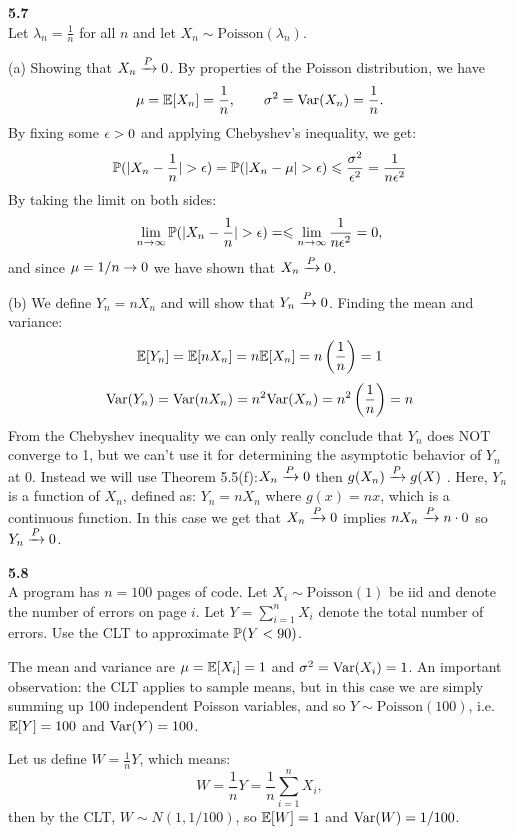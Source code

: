  \newpage\noindent
 \textbf{5.7}\\  %
 Let $\lambda_n = \frac{1}{n}$ for all $n$ and let $X_n\sim\text{Poisson}(\lambda_n)$.

 \medskip\noindent(a) Showing that $X_n \raP 0$. By properties of the Poisson
 distribution, we have
 $$
\mu = \E[X_n] = \frac{1}{n},\qquad \sigma^2 = \V(X_n) = \frac{1}{n}.
 $$
 By fixing some $\eps > 0$ and applying Chebyshev's inequality, we get:
 $$
 \P(|X_n - \frac{1}{n}| > \eps) = \P(|X_n - \mu| > \eps) \leq \frac{\sigma^2}{\eps^2} = \frac{1}{n\eps^2}
 $$
By taking the limit on both sides:
$$
\lim_{n\ra\infty}\P(|X_n - \frac{1}{n}| > \eps) =  \leq \lim_{n\ra\infty}\frac{1}{n\eps^2} = 0,
$$
and since $\mu = 1/n \ra 0$ we have shown that $X_n\raP 0$.

\medskip\noindent(b) We define $Y_n = nX_n$ and will show that $Y_n\raP 0$.
Finding the mean and variance:
$$
\E[Y_n] = \E[nX_n] = n\E[X_n] = n\left(\frac{1}{n}\right) = 1
$$
$$
\V(Y_n) = \V(nX_n) = n^2\V(X_n) = n^2\left(\frac{1}{n}\right) = n
$$
From the Chebyshev inequality we can only really conclude that $Y_n$ does NOT converge to 1,
but we can't use it for determining the asymptotic behavior of $Y_n$ at 0. Instead we will
use Theorem 5.5(f):$X_n \raP 0$ then $g(X_n)\raP g(X)$ . Here, $Y_n$ is a function of $X_n$,
defined as: $Y_n = nX_n$ where $g(x) = nx$, which is a continuous function.
In this case we get that $X_n \raP 0$ implies $nX_n\raP n\cdot 0$ so $Y_n \raP 0$.

\bigskip\noindent
\textbf{5.8}\\  %
A program has $n=100$ pages of code. Let $X_i\sim\text{Poisson}(1)$ be iid and denote the
number of errors on page $i$. Let $Y = \sum_{i=1}^n X_i$ denote the total
number of errors. Use the CLT to approximate $\P(Y < 90)$.

\medskip\noindent The mean and variance are $\mu = \E[X_i] = 1$ and $\sigma^2 = \V(X_i) = 1$.
An important observation: the CLT applies to sample means, but in this case we are simply
summing up 100 independent Poisson variables, and so $Y\sim\text{Poisson}(100)$,
i.e. $\E[Y] = 100$ and $\V(Y) = 100$.

Let us define $W = \frac{1}{n}Y$, which means:
$$
W = \frac{1}{n}Y = \frac{1}{n}\sum_{i=1}^n X_i,
$$
then by the CLT, $W\sim N(1, 1/100)$, so $\E[W] = 1$ and $\V(W) = 1/100$.

